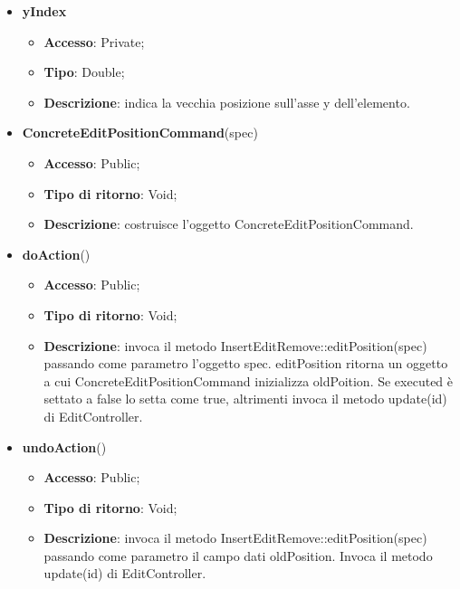 {{{\begin{itemize}
\begin{itemize}
\begin{itemize}
\begin{itemize}
			\end{itemize}
			\item \textbf{yIndex}
			\begin{itemize}
				\item \textbf{Accesso}: Private;
				\item \textbf{Tipo}: Double;
				\item \textbf{Descrizione}: indica la vecchia posizione sull’asse y dell’elemento.
			\end{itemize}
		\end{itemize}
			\end{itemize}
			\end{itemize}
		\begin{itemize}
			\item \textbf{ConcreteEditPositionCommand}(spec)
			\begin{itemize}
				\item \textbf{Accesso}: Public;
				\item \textbf{Tipo di ritorno}: Void;
				\item \textbf{Descrizione}: costruisce l’oggetto ConcreteEditPositionCommand.
			\end{itemize}
			\item \textbf{doAction}()
			\begin{itemize}
				\item \textbf{Accesso}: Public;
				\item \textbf{Tipo di ritorno}: Void;
				\item \textbf{Descrizione}: invoca il metodo InsertEditRemove::editPosition(spec) passando come parametro l'oggetto spec. editPosition ritorna un oggetto a cui ConcreteEditPositionCommand inizializza oldPoition. Se executed è settato a false lo setta come true, altrimenti invoca il metodo update(id) di EditController.
			\end{itemize}
			\item \textbf{undoAction}()
			\begin{itemize}
				\item \textbf{Accesso}: Public;
				\item \textbf{Tipo di ritorno}: Void;
				\item \textbf{Descrizione}: invoca il metodo InsertEditRemove::editPosition(spec) passando come parametro il campo dati oldPosition. Invoca il metodo update(id) di EditController.
			\end{itemize}
		\end{itemize}
		}
	}}

